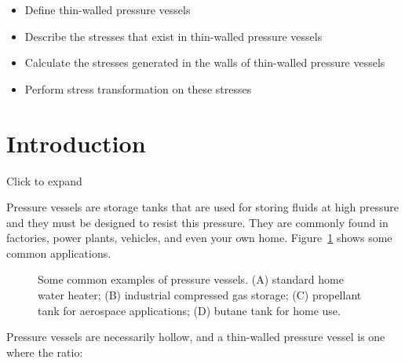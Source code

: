 \documentclass[
  letterpaper,
  DIV=11,
  numbers=noendperiod]{scrreprt}
\providecommand{\tightlist}{%
  \setlength{\itemsep}{0pt}\setlength{\parskip}{0pt}}\usepackage{longtable,booktabs,array}
\theoremstyle{definition}
\theoremstyle{remark}
\begin{document}
\begin{tcolorbox}[enhanced jigsaw, leftrule=.75mm, bottomrule=.15mm, opacityback=0, opacitybacktitle=0.6, colframe=quarto-callout-note-color-frame, toprule=.15mm, colbacktitle=quarto-callout-note-color!10!white, coltitle=black, bottomtitle=1mm, title={Learning Objectives}, titlerule=0mm, toptitle=1mm, colback=white, rightrule=.15mm, left=2mm, arc=.35mm, breakable]

\begin{itemize}
\tightlist
\item
  Define thin-walled pressure vessels
\item
  Describe the stresses that exist in thin-walled pressure vessels
\item
  Calculate the stresses generated in the walls of thin-walled pressure
  vessels
\item
  Perform stress transformation on these stresses
\end{itemize}

\end{tcolorbox}

\section*{Introduction}\label{introduction-12}


Click to expand

Pressure vessels are storage tanks that are used for storing fluids at
high pressure and they must be designed to resist this pressure. They
are commonly found in factories, power plants, vehicles, and even your
own home. Figure~\ref{fig-13.1} shows some common applications.

\begin{figure}


\caption{\label{fig-13.1}Some common examples of pressure vessels. (A)
standard home water heater; (B) industrial compressed gas storage; (C)
propellant tank for aerospace applications; (D) butane tank for home
use.}

\end{figure}%

Pressure vessels are necessarily hollow, and a thin-walled pressure
vessel is one where the ratio:
\end{document}
